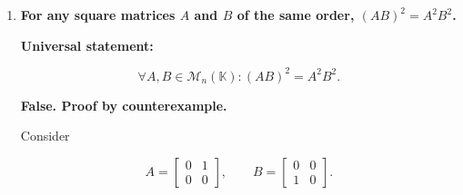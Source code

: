 \begin{enumerate}[label=\alph*)]
\begin{answer}
    Thus,

    $$
    \exists k=2\in\mathbb{N}^+:
    A^k=0_2,
    \quad A\neq0_2.
    $$

    Therefore, the statement is false.

    \par\bigskip
    \noindent\textbf{Sufficient condition:}

    Suppose $A$ is idempotent, i.e.,

    $$
    A^2=A.
    $$

    By mathematical induction,

    $$
    \forall p\in\mathbb{N}^+:
    A^p=A.
    $$

    Indeed, the base case $A^1=A$ holds.
    Assuming $A^p=A$ for some $p\geq1$,
    multiplying by $A$ gives

    $$
    \begin{aligned}
        A^{p+1}
        &=A^pA \\
        &=AA \\
        &=A^2 \\
        &=A.
    \end{aligned}
    $$

    Now, if

    $$
    \exists k\in\mathbb{N}^+:
    A^k=0_n,
    $$

    then, since $A^k=A$,

    $$
    A=A^k=0_n.
    $$

    Therefore,

    $$
    \boxed{A=0_n}.
    $$

    A matrix that is both idempotent and nilpotent must be zero.
\end{answer}


\item {\bfseries\boldmath
    For any square matrices $A$ and $B$
    of the same order, $(AB)^2=A^2B^2$.
}

\begin{answer}
    \textbf{Universal statement:}

    $$
    \forall A,B\in\mathcal{M}_n(\mathbb{K}):
    (AB)^2=A^2B^2.
    $$

    \textbf{False. Proof by counterexample.}

    Consider

    $$
    A=\begin{bmatrix}
        0 & 1 \\
        0 & 0
    \end{bmatrix},
    \qquad
    B=\begin{bmatrix}
        0 & 0 \\
        1 & 0
    \end{bmatrix}.
    $$


\end{answer}
\end{enumerate}

